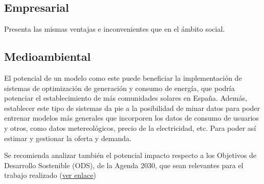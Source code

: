 \subsection{Empresarial}
Presenta las mismas ventajas e inconvenientes que en el ámbito social. 
\subsection{Medioambiental}
El potencial de un modelo como este puede beneficiar la implementación de sistemas de optimización de generación y consumo de energía, que podría potenciar el establecimiento de más comunidades solares en España. Además, establecer este tipo de sistemas da pie a la posibilidad de minar datos para poder entrenar modelos más generales que incorporen los datos de consumo de usuarios y otros, como datos metereológicos, precio de la electricidad, etc. Para poder así estimar y gestionar la oferta y demanda. 

Se recomienda analizar también el potencial impacto respecto a los Objetivos de Desarrollo Sostenible (ODS), de la Agenda 2030, que sean relevantes para el trabajo realizado (\href{https://www.un.org/sustainabledevelopment/es/objetivos-de-desarrollo-sostenible/}{ver enlace})
